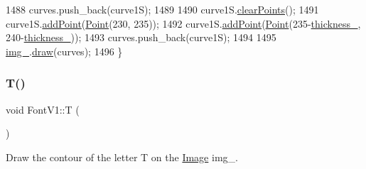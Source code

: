 \begin{DoxyCode}
1488     curves.push\_back(curve1S);
1489 
1490     curve1S.\mbox{\hyperlink{class_bezier_curve_a0ba8ce66d5af5971ae6a1b506029728e}{clearPoints}}();
1491     curve1S.\mbox{\hyperlink{class_bezier_curve_a38d16c18b36ae45619b05e26e226cf34}{addPoint}}(\mbox{\hyperlink{class_point}{Point}}(230, 235));
1492     curve1S.\mbox{\hyperlink{class_bezier_curve_a38d16c18b36ae45619b05e26e226cf34}{addPoint}}(\mbox{\hyperlink{class_point}{Point}}(235-\mbox{\hyperlink{class_font_v1_aed8040e76be9a52833627b92f0fb4e5f}{thickness\_}}, 240-\mbox{\hyperlink{class_font_v1_aed8040e76be9a52833627b92f0fb4e5f}{thickness\_}}));
1493     curves.push\_back(curve1S);
1494 
1495     \mbox{\hyperlink{class_font_v1_a00569e3e3c4b70f437b63f396f735fb0}{img\_}}.\mbox{\hyperlink{class_image_a8d162f3cab956131d58708c09aa560b0}{draw}}(curves);
1496 \}
\end{DoxyCode}
\mbox{\label{class_font_v1_ab520e2522e89b6ff20e42621080edd7d}} 
\subsubsection{\texorpdfstring{T()}{T()}}
{\footnotesize\ttfamily void Font\+V1\+::T (\begin{DoxyParamCaption}{ }\end{DoxyParamCaption})}



Draw the contour of the letter T on the \mbox{\hyperlink{class_image}{Image}} img\+\_\+. 


